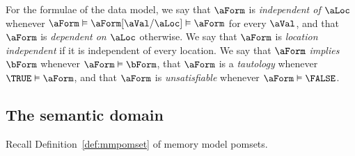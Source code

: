 




For the formulae of the data model, we say that $\aForm$ is \emph{independent of $\aLoc$} whenever
$\aForm \vDash \aForm[\aVal/\aLoc] \vDash \aForm$ for every $\aVal$, and that
$\aForm$ is \emph{dependent on $\aLoc$} otherwise.  We say that $\aForm$ is
\emph{location independent} if it is independent of every location.
%
We say that $\aForm$ \emph{implies} $\bForm$ whenever $\aForm\vDash\bForm$,
that $\aForm$ is a \emph{tautology} whenever $\TRUE\vDash\aForm$, and that
$\aForm$ is \emph{unsatisfiable} whenever $\aForm\vDash\FALSE$.

\subsection{The semantic domain}
\label{sec:sets}
Recall Definition~\ref{def:mmpomset} of memory model pomsets.

